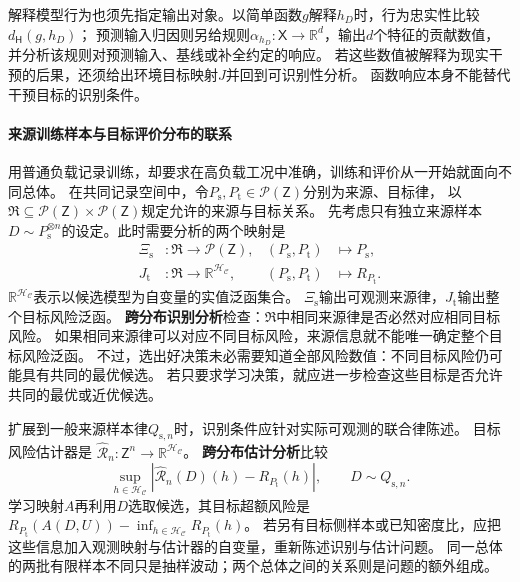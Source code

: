 解释模型行为也须先指定输出对象。以简单函数$g$解释$h_D$时，行为忠实性比较$d_{\mathsf H}(g,h_D)$；
预测输入归因则另给规则$\alpha_{h_D}:\mathsf X\to\mathbb R^d$，输出$d$个特征的贡献数值，
并分析该规则对预测输入、基线或补全约定的响应。
若这些数值被解释为现实干预的后果，还须给出环境目标映射$J$并回到可识别性分析。
函数响应本身不能替代干预目标的识别条件。

\paragraph{来源训练样本与目标评价分布的联系}
\label{sec:future-ml-adaptation-feedback}

用普通负载记录训练，却要求在高负载工况中准确，训练和评价从一开始就面向不同总体。
在共同记录空间中，令$P_{\mathrm s},P_{\mathrm t}\in\mathcal P(\mathsf Z)$分别为来源、目标律，
以$\mathfrak R\subseteq\mathcal P(\mathsf Z)\times\mathcal P(\mathsf Z)$规定允许的来源与目标关系。
先考虑只有独立来源样本$D\sim P_{\mathrm s}^{\otimes n}$的设定。此时需要分析的两个映射是
\begin{equation}
  \begin{aligned}
    \Xi_{\mathrm s}&:\mathfrak R\to\mathcal P(\mathsf Z),
      &(P_{\mathrm s},P_{\mathrm t})&\mapsto P_{\mathrm s},\\
    J_{\mathrm t}&:\mathfrak R\to\mathbb R^{\mathcal H_{\mathcal C}},
      &(P_{\mathrm s},P_{\mathrm t})&\mapsto R_{P_{\mathrm t}}.
  \end{aligned}
  \label{eq:future-task-source-target-maps}
\end{equation}
$\mathbb R^{\mathcal H_{\mathcal C}}$表示以候选模型为自变量的实值泛函集合。
$\Xi_{\mathrm s}$输出可观测来源律，$J_{\mathrm t}$输出整个目标风险泛函。
\textbf{跨分布识别分析}检查：$\mathfrak R$中相同来源律是否必然对应相同目标风险。
如果相同来源律可以对应不同目标风险，来源信息就不能唯一确定整个目标风险泛函。
不过，选出好决策未必需要知道全部风险数值：不同目标风险仍可能具有共同的最优候选。
若只要求学习决策，就应进一步检查这些目标是否允许共同的最优或近优候选。

扩展到一般来源样本律$Q_{{\mathrm s},n}$时，识别条件应针对实际可观测的联合律陈述。
目标风险估计器是
$\widehat{\mathcal R}_n:\mathsf Z^n\to\mathbb R^{\mathcal H_{\mathcal C}}$。
\textbf{跨分布估计分析}比较
\[
  \sup_{h\in\mathcal H_{\mathcal C}}
    |\widehat{\mathcal R}_n(D)(h)-R_{P_{\mathrm t}}(h)|,
  \qquad D\sim Q_{{\mathrm s},n}.
\]
学习映射$A$再利用$D$选取候选，其目标超额风险是
$R_{P_{\mathrm t}}(A(D,U))-\inf_{h\in\mathcal H_{\mathcal C}}R_{P_{\mathrm t}}(h)$。
若另有目标侧样本或已知密度比，应把这些信息加入观测映射与估计器的自变量，重新陈述识别与估计问题。
同一总体的两批有限样本不同只是抽样波动；两个总体之间的关系则是问题的额外组成。

